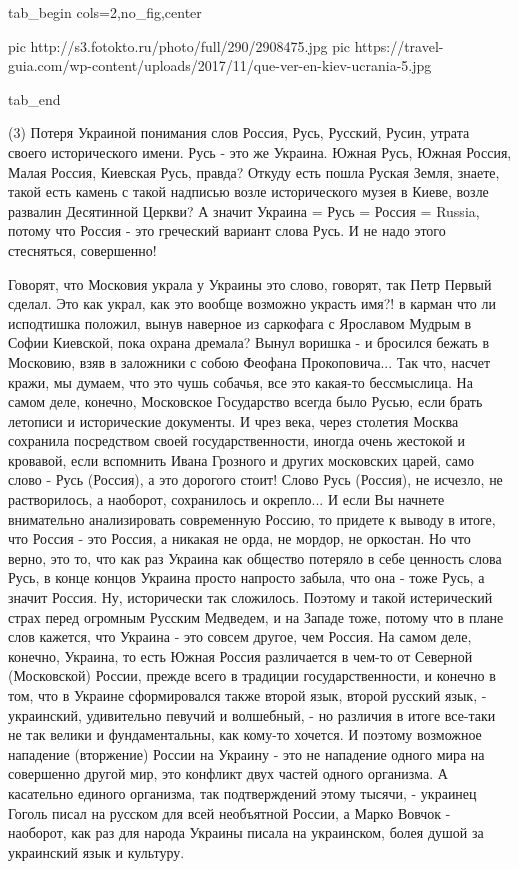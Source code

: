 \ifcmt
  tab_begin cols=2,no_fig,center

     pic http://s3.fotokto.ru/photo/full/290/2908475.jpg
     pic https://travel-guia.com/wp-content/uploads/2017/11/que-ver-en-kiev-ucrania-5.jpg

  tab_end
\fi

(3) Потеря Украиной понимания слов Россия, Русь, Русский, Русин, утрата своего
исторического имени. Русь - это же Украина. Южная Русь, Южная Россия, Малая
Россия, Киевская Русь, правда?  Откуду есть пошла Руская Земля, знаете, такой
есть камень с такой надписью возле исторического музея в Киеве, возле развалин
Десятинной Церкви?  А значит Украина = Русь = Россия = Russia, потому что
Россия - это греческий вариант слова Русь. И не надо этого стесняться,
совершенно! 

Говорят, что Московия украла у Украины это слово, говорят, так Петр Первый
сделал. Это как украл, как это вообще возможно украсть имя?! в карман что ли
исподтишка положил, вынув наверное из саркофага с Ярославом Мудрым в Софии
Киевской, пока охрана дремала? Вынул воришка - и бросился бежать в Московию,
взяв в заложники с собою Феофана Прокоповича... Так что, насчет кражи, мы
думаем, что это чушь собачья, все это какая-то бессмыслица. На самом деле,
конечно, Московское Государство всегда было Русью, если брать летописи и
исторические документы. И чрез века, через столетия Москва сохранила
посредством своей государственности, иногда очень жестокой и кровавой, если
вспомнить Ивана Грозного и других московских царей, само слово - Русь (Россия),
а это дорогого стоит! Слово Русь (Россия), не исчезло, не растворилось, а
наоборот, сохранилось и окрепло... И если Вы начнете внимательно анализировать
современную Россию, то придете к выводу в итоге, что Россия - это Россия, а
никакая не орда, не мордор, не оркостан. Но что верно, это то, что как раз
Украина как общество потеряло в себе ценность слова Русь, в конце концов
Украина просто напросто забыла, что она - тоже Русь, а значит Россия. Ну,
исторически так сложилось. Поэтому и такой истерический страх перед огромным
Русским Медведем, и на Западе тоже, потому что в плане слов кажется, что Украина
- это совсем другое, чем Россия. На самом деле, конечно, Украина, то есть Южная
Россия различается в чем-то от Северной (Московской) России, прежде всего в
традиции государственности, и конечно в том, что в Украине сформировался также
второй язык, второй русский язык, - украинский, удивительно певучий и
волшебный, - но различия в итоге все-таки не так велики и фундаментальны, как
кому-то хочется.  И поэтому возможное нападение (вторжение) России на Украину -
это не нападение одного мира на совершенно другой мир, это конфликт двух частей
одного организма. А касательно единого организма, так подтверждений этому
тысячи, - украинец Гоголь писал на русском для всей необъятной России, а Марко
Вовчок - наоборот, как раз для народа Украины писала на украинском, болея душой
за украинский язык и культуру.

